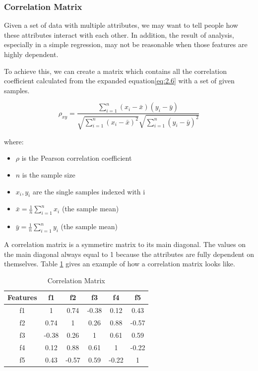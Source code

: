 \documentclass[11pt]{article} %
\theoremstyle{plain}
\theoremstyle{definition}
\begin{document}
\subsubsection{Correlation Matrix}

Given a set of data with multiple attributes, we may want to tell people how these attributes interact with each other. In addition, the result of analysis, especially in a simple regression, may not be reasonable when those features are highly dependent.

To achieve this, we can create a matrix which contains all the correlation coefficient calculated from the expanded equation\eqref{eq:2.6} with a set of given samples.

{
  \begin{equation}
    \label{eq:2.6}
    \tag{2.6}
    {\rho_{xy}={\frac {\sum _{i=1}^{n}(x_{i}-{\bar {x}})(y_{i}-{\bar {y}})}{{\sqrt {\sum _{i=1}^{n}(x_{i}-{\bar {x}})^{2}}}{\sqrt {\sum _{i=1}^{n}(y_{i}-{\bar {y}})^{2}}}}}}
  \end{equation}

  \footnotesize
  where:
  \begin{itemize}[label=-, leftmargin=4em, itemsep=0.1em]
    \item ${\rho}$ is the Pearson correlation coefficient
    \item ${n}$ is the sample size
    \item $x_{i}, y_{i}$ are the single samples indexed with i
    \item ${\bar {x}}={\frac {1}{n}}\sum _{i=1}^{n}x_{i}$ (the sample mean)
    \item ${\bar {y}}={\frac {1}{n}}\sum _{i=1}^{n}y_{i}$ (the sample mean)
  \end{itemize}
}

A correlation matrix is a symmetirc matrix to its main diagonal. The values on the main diagonal always equal to 1 because the attributes are fully dependent on themselves. Table \ref{table:cormat} gives an example of how a correlation matrix looks like.

{
  \begin{table}[ht]
    \centering
    \begin{tabular}{|c|c c c c c|}
      \hline
      Features & f1 & f2 & f3 & f4 & f5 \\ [0.5ex]
      \hline
      f1 & 1 & 0.74 & -0.38 & 0.12 & 0.43 \\
      \hline
      f2 & 0.74 & 1 & 0.26 & 0.88 & -0.57 \\
      \hline
      f3 & -0.38 & 0.26 & 1 & 0.61 & 0.59 \\
      \hline
      f4 & 0.12 & 0.88 & 0.61 & 1 & -0.22 \\
      \hline
      f5 & 0.43 & -0.57 & 0.59 & -0.22 & 1 \\
      \hline
    \end{tabular}
    \caption{Correlation Matrix}
    \label{table:cormat}
  \end{table}
}
\end{document}
